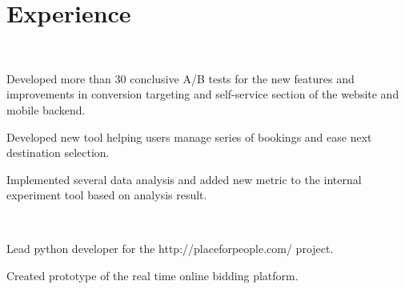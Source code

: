 \documentclass[]{hieudo-build}
\begin{document}
\begin{minipage}[t]{0.34\textwidth}

\sectionsep{}

%
%
\end{minipage} 
\hfill
\begin{minipage}[t]{0.65\textwidth} 

\section{Experience}

\\
\vspace{0.9em} %
\begin{tightemize}
\item Developed more than 30 conclusive A/B tests for the new features and improvements in conversion targeting and self-service section of the website and mobile backend.
\item Developed new tool helping users manage series of bookings and ease next destination selection.
\item Implemented several data analysis and added new metric to the internal experiment tool based on analysis result.  
\end{tightemize}
\sectionsep{}

 \\
\begin{tightemize}
\item Lead python developer for the http://placeforpeople.com/ project.
\item Created prototype of the real time online bidding platform.
\end{tightemize}
\sectionsep{}


\end{minipage}
\end{document}
